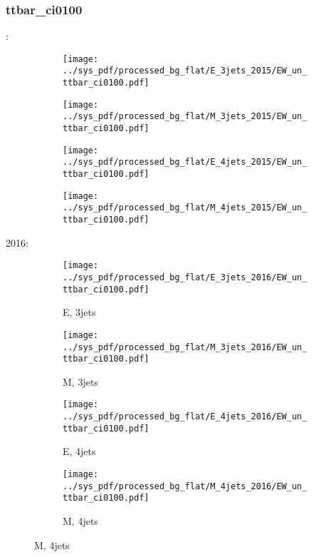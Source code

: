 \documentclass{beamer}
\begin{document}
\begin{frame}
\frametitle{ttbar_ci0100}
\fontsize{5}{1}:
\begin{figure}
\centering
\begin{subfigure}[b]{0.24\textwidth}
\texttt{[image: ../sys\_pdf/processed\_bg\_flat/E\_3jets\_2015/EW\_un\_ttbar\_ci0100.pdf]}
\end{subfigure}
\begin{subfigure}[b]{0.24\textwidth}
\texttt{[image: ../sys\_pdf/processed\_bg\_flat/M\_3jets\_2015/EW\_un\_ttbar\_ci0100.pdf]}
\end{subfigure}
\begin{subfigure}[b]{0.24\textwidth}
\texttt{[image: ../sys\_pdf/processed\_bg\_flat/E\_4jets\_2015/EW\_un\_ttbar\_ci0100.pdf]}
\end{subfigure}
\begin{subfigure}[b]{0.24\textwidth}
\texttt{[image: ../sys\_pdf/processed\_bg\_flat/M\_4jets\_2015/EW\_un\_ttbar\_ci0100.pdf]}
\end{subfigure}
\end{figure}
2016:
\begin{figure}
\centering
\begin{subfigure}[b]{0.24\textwidth}
\texttt{[image: ../sys\_pdf/processed\_bg\_flat/E\_3jets\_2016/EW\_un\_ttbar\_ci0100.pdf]}
\captionsetup{font=tiny}
\caption{E, 3jets}
\end{subfigure}
\begin{subfigure}[b]{0.24\textwidth}
\texttt{[image: ../sys\_pdf/processed\_bg\_flat/M\_3jets\_2016/EW\_un\_ttbar\_ci0100.pdf]}
\captionsetup{font=tiny}
\caption{M, 3jets}
\end{subfigure}
\begin{subfigure}[b]{0.24\textwidth}
\texttt{[image: ../sys\_pdf/processed\_bg\_flat/E\_4jets\_2016/EW\_un\_ttbar\_ci0100.pdf]}
\captionsetup{font=tiny}
\caption{E, 4jets}
\end{subfigure}
\begin{subfigure}[b]{0.24\textwidth}
\texttt{[image: ../sys\_pdf/processed\_bg\_flat/M\_4jets\_2016/EW\_un\_ttbar\_ci0100.pdf]}
\captionsetup{font=tiny}
\caption{M, 4jets}
\end{subfigure}
\end{figure}
\end{frame}
\end{document}
